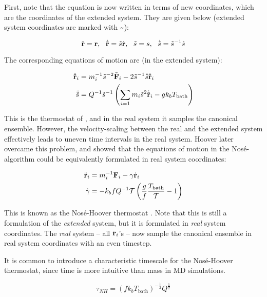 First, note that the equation is now written in terms of new coordinates, which are the coordinates of the extended system. They are given below (extended system coordinates are marked with \textasciitilde): 

\begin{equation}
	\tilde\rvec = \rvec, \ \ \dot{\tilde\rvec} = \tilde s \dot\rvec, \ \ \tilde s = s, \ \ \dot{\tilde s} = \tilde s^{-1} \dot{s}
\end{equation}

The corresponding equations of motion are (in the extended system):

\begin{align}
	\ddot{\tilde{\mathbf{r}}}_i & = m_i^{-1} \tilde s^{-2} \tilde{\mathbf{F}}_i - 2\tilde s^{-1} \dot{\tilde s} \dot{\tilde{\mathbf{r}}}_i \\
	\ddot{\tilde s} & =  Q^{-1} \tilde s^{-1} \left(\sum_{i=1}m_i\tilde s^2 \dot{\tilde{\mathbf{r}}}_i - gk_bT_{\text{bath}}\right)
\end{align}

This is the thermostat of \citet{Nose1984}, and in the real system it samples the canonical ensemble. However, the velocity-scaling between the real and the extended system effectively leads to uneven time intervals in the real system. Hoover later overcame this problem, and showed that the equations of motion in the Nosé-algorithm could be equivalently formulated in real system coordinates:

\begin{align}
	\ddot {\mathbf{r}}_i & = m_i^{-1} \mathbf{F}_i -\gamma \dot{\mathbf{r}}_i \\
	\dot \gamma & = -k_b f Q^{-1} \mathcal{T} \left(\frac{g}{f} \frac{T_{\text{bath}}}{\mathcal{T}}-1\right)
\end{align}

This is known as the Nosé-Hoover thermostat \cite{PhysRevA.31.1695}. Note that this is still a formulation of the \emph{extended} system, but it is formulated in \emph{real} system coordinates. The \emph{real} system -- all $\ddot{\mathbf{r}}_i$'s -- now sample the canonical ensemble in real system coordinates with an even timestep.

It is common to introduce a characteristic timescale for the Nosé-Hoover thermostat, since time is more intuitive than mass in MD simulations. 

\begin{equation}
	\tau_{NH} = (fk_b T_{\text{bath}})^{-\frac{1}{2}} Q^{\frac{1}{2}}
\end{equation}

